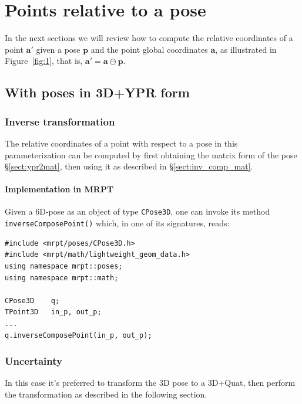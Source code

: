 \documentclass[a4paper,11pt]{report}
\begin{document}
\chapter{Points relative to a pose}
\label{ch:inv_pose_point}

In the next sections we will review how to compute the relative coordinates
of a point $\mathbf{a'}$ given a pose $\mathbf{p}$ and the point global coordinates
$\mathbf{a}$,
as illustrated in Figure~\ref{fig:1}, that is, $\mathbf{a'} = \mathbf{a} \ominus \mathbf{p}$.

\section{With poses in 3D+YPR form}

\subsection{Inverse transformation}

The relative coordinates of a point with respect to a pose in this parameterization can be computed
by first obtaining the matrix form of the pose \S\ref{sect:ypr2mat}, then using it as described in \S\ref{sect:inv_comp_mat}.



\subsubsection{Implementation in MRPT}

Given a 6D-pose as an object of type \texttt{CPose3D}, one can invoke its method
\texttt{inverseComposePoint()} which, in one of its signatures, reads:

\begin{lstlisting}
#include <mrpt/poses/CPose3D.h>
#include <mrpt/math/lightweight_geom_data.h>
using namespace mrpt::poses;
using namespace mrpt::math;

CPose3D    q;
TPoint3D   in_p, out_p;
...
q.inverseComposePoint(in_p, out_p);
\end{lstlisting}


\subsection{Uncertainty}

In this case it's preferred to transform the 3D pose to a 3D+Quat, then
perform the transformation as described in the following section.
\end{document}
